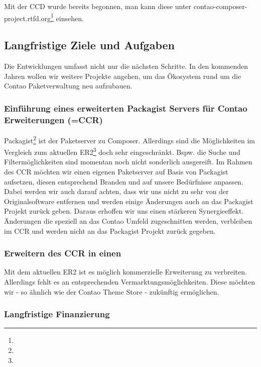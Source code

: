 \documentclass[
paper=a4,
draft=false,%
fontsize=10pt%
]{scrartcl}
\begin{document}
Mit der CCD wurde bereits begonnen, man kann diese unter contao-composer-project.rtfd.org\footnote{} einsehen.

\subsection{Langfristige Ziele und Aufgaben}
\label{sec:long-term-goals}

Die Entwicklungen umfasst nicht nur die nächsten Schritte. In den kommenden Jahren wollen wir weitere Projekte angehen, um das Ökosystem rund um die Contao Paketverwaltung neu aufzubauen.

\subsubsection{Einführung eines erweiterten Packagist Servers für Contao Erweiterungen (=CCR)}

Packagist\footnote{} ist der Paketserver zu Composer. Allerdings sind die Möglichkeiten im Vergleich zum aktuellen ER2\footnote{} doch sehr eingeschränkt. Bspw. die Suche und Filtermöglichkeiten sind momentan noch nicht sonderlich ausgereift. Im Rahmen des CCR möchten wir einen eigenen Paketserver auf Basis von Packagist aufsetzen, diesen entsprechend Branden und auf unsere Bedürfnisse anpassen.\\
Dabei werden wir auch darauf achten, dass wir uns nicht zu sehr von der Originalsoftware entfernen und werden einige Änderungen auch an das Packagist Projekt zurück geben. Daraus erhoffen wir uns einen stärkeren Synergieeffekt. Änderungen die speziell an das Contao Umfeld zugeschnitten werden, verbleiben im CCR und werden nicht an das Packagist Projekt zurück gegeben.

\subsubsection{Erweitern des CCR in einen }

Mit dem aktuellen ER2 ist es möglich kommerzielle Erweiterung zu verbreiten. Allerdings fehlt es an entsprechenden Vermarktungsmöglichkeiten. Diese möchten wir - so ähnlich wie der Contao Theme Store - zukünftig ermöglichen.

\subsubsection{Langfristige Finanzierung}
\end{document}
